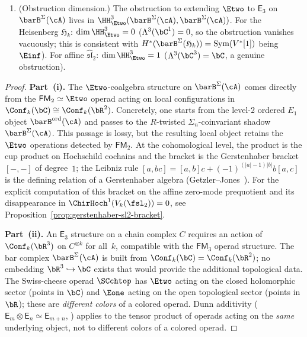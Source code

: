 \begin{proposition}
\begin{enumerate}[label=\textup{(\roman*)}]
\item \textup{(Obstruction dimension.)}
 The obstruction to extending $\Etwo$ to $\mathsf{E}_3$ on
 $\barB^{\Sigma}(\cA)$ lives in
 $\HH^3_{\Etwo}(\barB^{\Sigma}(\cA), \barB^{\Sigma}(\cA))$. For the Heisenberg
 $\mathfrak{H}_k$: $\dim \HH^3_{\Etwo} = 0$
 \textup{(}$\Lambda^3(\bC^1) = 0$, so the obstruction vanishes
 vacuously; this is consistent with
 $H^*(\barB^{\Sigma}(\mathfrak{H}_k))
 = \operatorname{Sym}(V^*[1])$ being $\Einf$\textup{)}.
 For affine $\widehat{\mathfrak{sl}}_2$:
 $\dim \HH^3_{\Etwo} = 1$
 \textup{(}$\Lambda^3(\bC^3) = \bC$, a genuine
 obstruction\textup{)}.
\end{enumerate}
\end{proposition}

\begin{proof}
\textbf{Part~(i).}
The $\Etwo$-coalgebra structure on $\barB^{\Sigma}(\cA)$ comes
directly from the $\mathsf{FM}_2 \simeq \Etwo$ operad acting on local
configurations in $\Conf_k(\bC) \cong \Conf_k(\bR^2)$. Concretely,
one starts from the level-$2$ ordered $E_1$ object
$\barB^{\mathrm{ord}}(\cA)$ and passes to the
$R$-twisted $\Sigma_n$-coinvariant shadow $\barB^{\Sigma}(\cA)$.
This passage is lossy, but the resulting local object retains the
$\Etwo$ operations detected by $\mathsf{FM}_2$.
At the cohomological level, the product is the cup product on
Hochschild cochains and the bracket is the Gerstenhaber bracket
$[-,-]$ of degree~$1$; the Leibniz rule $[a, bc] = [a,b]c
+ (-1)^{(|a|-1)|b|} b[a,c]$ is the defining relation of a
Gerstenhaber algebra (Getzler--Jones~\cite{GJ}).
For the explicit computation of this bracket on the affine zero-mode
prequotient and its disappearance in
\(\ChirHoch^1(V_k(\fsl_2))=0\), see
Proposition~\ref{prop:gerstenhaber-sl2-bracket}.

\textbf{Part~(ii).}
An $\mathsf{E}_3$ structure on a chain complex $C$ requires an
action of $\Conf_k(\bR^3)$ on $C^{\otimes k}$ for all~$k$,
compatible with the $\mathsf{FM}_3$ operad structure. The bar
complex $\barB^{\Sigma}(\cA)$ is built from
$\Conf_k(\bC) = \Conf_k(\bR^2)$;
no embedding $\bR^3 \hookrightarrow \bC$ exists
that would provide the additional topological data.
The Swiss-cheese operad $\SCchtop$ has
$\Etwo$ acting on the closed holomorphic sector (points in $\bC$)
and $\Eone$ acting on the open topological sector (points in $\bR$);
these are \emph{different colors} of a colored operad.
Dunn additivity ($\mathsf{E}_m \otimes \mathsf{E}_n
\simeq \mathsf{E}_{m+n}$, \cite{Dunn88})
applies to the tensor product of operads acting on the
\emph{same} underlying object, not to different colors of a
colored operad.


\end{proof}
